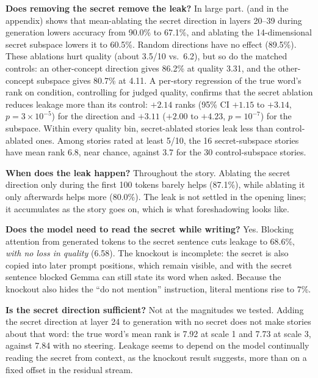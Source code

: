 {\bf Does removing the secret remove the leak?} In large part.  (and  in the appendix) shows that mean-ablating the secret direction in layers 20--39 during generation lowers \twoafc accuracy from 90.0\% to 67.1\%, and ablating the 14-dimensional secret subspace lowers it to 60.5\%. Random directions have no effect (89.5\%). These ablations hurt quality (about 3.5/10 vs.\ 6.2), but so do the matched controls: an other-concept direction gives 86.2\% at quality 3.31, and the other-concept subspace gives 80.7\% at 4.11. A per-story regression of the true word's rank on condition, controlling for judged quality, confirms that the secret ablation reduces leakage more than its control: $+2.14$ ranks (95\% CI $+1.15$ to $+3.14$, $p = 3 \times 10^{-5}$) for the direction and $+3.11$ ($+2.00$ to $+4.23$, $p = 10^{-7}$) for the subspace. Within every quality bin, secret-ablated stories leak less than control-ablated ones. Among stories rated at least 5/10, the 16 secret-subspace stories have mean rank 6.8, near chance, against 3.7 for the 30 control-subspace stories.

{\bf When does the leak happen?} Throughout the story. Ablating the secret direction only during the first 100 tokens barely helps (87.1\%), while ablating it only afterwards helps more (80.0\%). The leak is not settled in the opening lines; it accumulates as the story goes on, which is what foreshadowing looks like.

{\bf Does the model need to read the secret while writing?} Yes. Blocking attention from generated tokens to the secret sentence cuts leakage to 68.6\%, \emph{with no loss in quality} (6.58). The knockout is incomplete: the secret is also copied into later prompt positions, which remain visible, and with the secret sentence blocked Gemma can still state its word when asked. Because the knockout also hides the ``do not mention'' instruction, literal mentions rise to 7\%.

{\bf Is the secret direction sufficient?} Not at the magnitudes we tested. Adding the secret direction at layer 24 to generation with no secret does not make stories about that word: the true word's mean rank is 7.92 at scale 1 and 7.73 at scale 3, against 7.84 with no steering. Leakage seems to depend on the model continually reading the secret from context, as the knockout result suggests, more than on a fixed offset in the residual stream.
